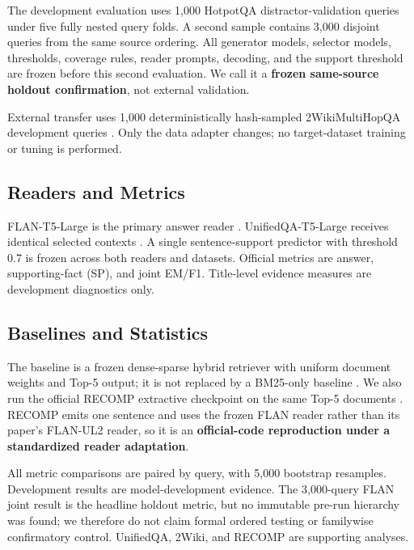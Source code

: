 \documentclass[10pt,twocolumn]{article}
\begin{document}
The development evaluation uses 1,000 HotpotQA distractor-validation queries \citep{yang-etal-2018-hotpotqa} under five fully nested query folds. A second sample contains 3,000 disjoint queries from the same source ordering. All generator models, selector models, thresholds, coverage rules, reader prompts, decoding, and the support threshold are frozen before this second evaluation. We call it a \textbf{frozen same-source holdout confirmation}, not external validation.

External transfer uses 1,000 deterministically hash-sampled 2WikiMultiHopQA development queries \citep{ho-etal-2020-2wiki}. Only the data adapter changes; no target-dataset training or tuning is performed.

\subsection{Readers and Metrics}

FLAN-T5-Large is the primary answer reader \citep{raffel-etal-2020-t5}. UnifiedQA-T5-Large receives identical selected contexts \citep{khashabi-etal-2020-unifiedqa}. A single sentence-support predictor with threshold 0.7 is frozen across both readers and datasets. Official metrics are answer, supporting-fact (SP), and joint EM/F1. Title-level evidence measures are development diagnostics only.

\subsection{Baselines and Statistics}

The baseline is a frozen dense-sparse hybrid retriever with uniform document weights and Top-5 output; it is not replaced by a BM25-only baseline \citep{robertson-zaragoza-2009-bm25}. We also run the official RECOMP extractive checkpoint on the same Top-5 documents \citep{xu-etal-2024-recomp}. RECOMP emits one sentence and uses the frozen FLAN reader rather than its paper's FLAN-UL2 reader, so it is an \textbf{official-code reproduction under a standardized reader adaptation}.

All metric comparisons are paired by query, with 5,000 bootstrap resamples. Development results are model-development evidence. The 3,000-query FLAN joint result is the headline holdout metric, but no immutable pre-run hierarchy was found; we therefore do not claim formal ordered testing or familywise confirmatory control. UnifiedQA, 2Wiki, and RECOMP are supporting analyses.
\end{document}

